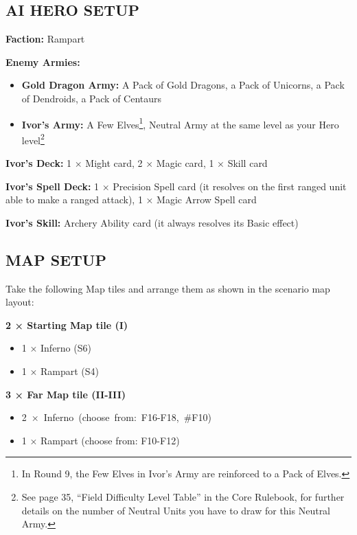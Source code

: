 \begin{multicols*}{2}
\subsection*{\MakeUppercase{AI hero setup}}

\textbf{Faction:} Rampart

\textbf{Enemy Armies:} 

\begin{itemize}
  \item \textbf{Gold Dragon Army:} A Pack of Gold Dragons, a Pack of Unicorns, a Pack of Dendroids, a Pack of Centaurs
  \item \textbf{Ivor's Army:} A Few Elves\footnote{In Round 9, the Few Elves in Ivor's Army are reinforced to a Pack of Elves.}, Neutral Army at the same level as your Hero level\footnote{See page 35, ``Field Difficulty Level Table'' in the Core Rulebook, for further details on the number of Neutral Units you have to draw for this Neutral Army.}
\end{itemize}

\textbf{Ivor's Deck:} 1 × Might card, 2 × Magic card, 1 × Skill card

\textbf{Ivor's Spell Deck:} 1 × Precision Spell card (it resolves on the first ranged unit able to make a ranged attack), 1 × Magic Arrow Spell card

\textbf{Ivor's Skill:} Archery Ability card (it always resolves its Basic effect)

\subsection*{\MakeUppercase{Map setup}}

Take the following Map tiles and arrange them as shown in the scenario map layout:

\textbf{2 × Starting Map tile (I)}
\begin{itemize}
  \item 1 × Inferno (S6)
  \item 1 × Rampart (S4)
\end{itemize}

\vspace*{\fill}\columnbreak

\textbf{3 × Far Map tile (II-III)}
\begin{itemize}
  \item \mbox{2 × Inferno (choose from: F16-F18, \#F10)}
  \item 1 × Rampart (choose from: F10-F12)
\end{itemize}


\end{multicols*}
